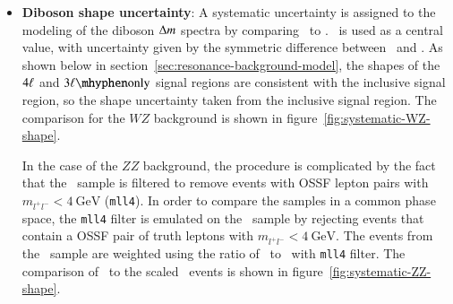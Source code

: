 \begin{itemize}
	\item \textbf{Diboson shape uncertainty}: A systematic uncertainty is assigned to the modeling of the diboson $\Delta m$ spectra by comparing \sherpa\ to \powheg. \sherpa\ is used as a central value, with uncertainty given by the symmetric difference between \sherpa\ and \powheg. As shown below in section~\ref{sec:resonance-background-model}, the shapes of the $4\ell$ and $\threelo$ signal regions are consistent with the inclusive signal region, so the shape uncertainty taken from the inclusive signal region. The comparison for the $WZ$ background is shown in figure~\ref{fig:systematic-WZ-shape}.


	In the case of the $ZZ$ background, the procedure is complicated by the fact that the \powheg\ sample is filtered to remove events with OSSF lepton pairs with $m_{l^+l^-}<4~\mbox{GeV}$ (\texttt{mll4}). In order to compare the samples in a common phase space, the \texttt{mll4} filter is emulated on the \sherpa\ sample by rejecting events that contain a OSSF pair of truth leptons with $m_{l^+l^-}<4~\mbox{GeV}$. 
	The events from the \powheg\ sample are weighted using the ratio of \sherpa\ to \sherpa\ with \texttt{mll4} filter. The comparison of \sherpa\ to the scaled \powheg\ events is shown in figure~\ref{fig:systematic-ZZ-shape}.


\end{itemize}
